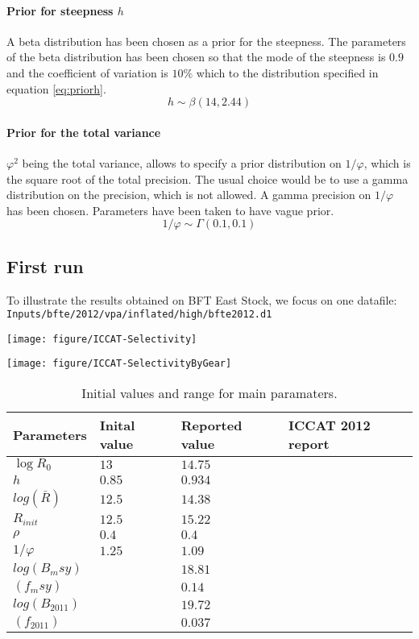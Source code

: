\paragraph{Prior for steepness $h$}
A beta distribution has been chosen as a prior for the steepness. The parameters of the beta distribution has been chosen so that the mode of the steepness is $0.9$ and the coefficient of variation is 
$10\%$ which to the distribution specified in equation \ref{eq:priorh}.
\begin{equation}
h \sim \beta\left(14, 2.44\right)
\label{eq:priorh}
\end{equation}


\paragraph{Prior for the total variance}
$\varphi^2$ being the total variance, \iscam allows to specify a prior distribution on $1/\varphi$, which is the square root of the total precision.
The usual choice would be to use a gamma distribution on the precision, which is not allowed. A gamma precision on $1/\varphi$ has been chosen. Parameters have been taken to have vague prior.
\begin{equation}
1/\varphi \sim \Gamma\left(0.1, 0.1\right)
\label{eq:priorphi}
\end{equation}

\subsection{First run}
To illustrate the results obtained on BFT East Stock, we focus on one datafile: \verb+Inputs/bfte/2012/vpa/inflated/high/bfte2012.d1+


{\centering \texttt{[image: figure/ICCAT-Selectivity]} 

}



{\centering \texttt{[image: figure/ICCAT-SelectivityByGear]} 
}


\begin{table}[ht]
\centering
\begin{tabular}{p{2.1cm}p{4cm}p{4cm}p{4cm}}
  \hline
Parameters & Inital value & Reported value & ICCAT 2012  report  \\ \hline
 $\log{R_0}$ & $13$  &  $14.75$ & \\
 $h$ & $0.85$ & $0.934$  &\\
$log(\bar{R})$& $12.5$ & $14.38$ \\
$R_{init}$ & $12.5$ & $15.22$\\
$\rho$ & $0.4$ &  $0.4$ & 	\\
$1/\varphi$ & $1.25$ & $1.09$ &\\
$log(B_msy)$ &  &$18.81$ & \\
$(f_msy)$ &  &$0.14$ & \\
$log(B_{2011})$ &  &$19.72$ & \\
$(f_{2011})$ &   &$0.037$ & \\
\hline
\end{tabular}
\caption{Initial values and range for main paramaters.}
\label{table:estimation}
\end{table}



